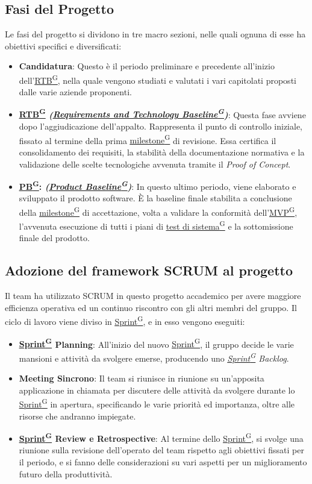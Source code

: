 \documentclass[a4paper,12pt]{article}
\providecommand{\glslink}[2]{\href{https://alittlebyte-19.github.io/Documentazione/glossario.html\#gls-#1}{\underline{#2}\textsuperscript{\scriptsize G}}}
\begin{document}
\subsection{Fasi del Progetto}
Le fasi del progetto si dividono in tre macro sezioni, nelle quali ognuna di esse ha obiettivi specifici e diversificati:
\begin{itemize}
    \item \textbf{Candidatura}: Questo è il periodo preliminare e precedente all'inizio dell'\glslink{rtb-requirements-and-technology-baseline}{RTB}, nella quale vengono studiati e valutati i vari
    capitolati proposti dalle varie aziende proponenti.
    \item \textbf{\glslink{rtb-requirements-and-technology-baseline}{RTB} \textit{(\glslink{rtb-requirements-and-technology-baseline}{Requirements and Technology Baseline})}}: Questa fase avviene dopo l'aggiudicazione dell'appalto. Rappresenta il punto di controllo iniziale, fissato al termine della prima \glslink{milestone}{milestone} di revisione. Essa certifica il consolidamento dei requisiti, la stabilità della documentazione normativa e la validazione delle scelte tecnologiche avvenuta tramite il \textit{Proof of Concept}.
    \item \textbf{\glslink{pb-product-baseline}{PB}: \textit{(\glslink{pb-product-baseline}{Product Baseline})}}: In questo ultimo periodo, viene elaborato e sviluppato il prodotto software. È la baseline finale stabilita a conclusione della \glslink{milestone}{milestone} di accettazione, volta a validare la conformità dell'\glslink{mvp-minimum-viable-product}{MVP}, l'avvenuta esecuzione di tutti i piani di \glslink{test-di-sistema}{test di sistema} e la sottomissione finale del prodotto.
\end{itemize}

\subsection{Adozione del framework SCRUM al progetto}
Il team ha utilizzato SCRUM in questo progetto accademico per avere maggiore efficienza operativa ed un continuo riscontro con gli altri membri del gruppo.
Il ciclo di lavoro viene diviso in \glslink{sprint}{Sprint}, e in esso vengono eseguiti:
\begin{itemize}
    \item \textbf{\glslink{sprint}{Sprint} Planning}: All'inizio del nuovo \glslink{sprint}{Sprint}, il gruppo decide le varie mansioni e attività da svolgere emerse, producendo uno \textit{\glslink{sprint}{Sprint} Backlog}.
    \item \textbf{Meeting Sincrono}: Il team si riunisce in riunione su un'apposita applicazione in chiamata per discutere delle attività da svolgere
    durante lo \glslink{sprint}{Sprint} in apertura, specificando le varie priorità ed importanza, oltre alle risorse che andranno impiegate.
    \item \textbf{\glslink{sprint}{Sprint} Review e Retrospective}: Al termine dello \glslink{sprint}{Sprint}, si svolge una riunione sulla revisione dell'operato del team rispetto agli obiettivi
    fissati per il periodo, e si fanno delle considerazioni su vari aspetti per un miglioramento futuro della produttività.
\end{itemize}
\end{document}

